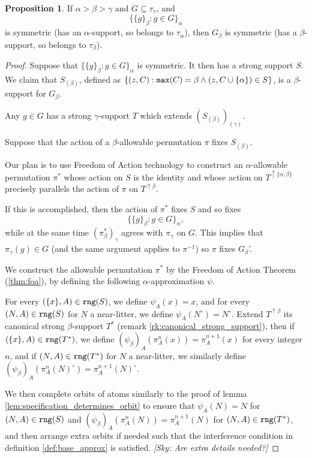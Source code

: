 \documentclass[112pt]{article}
\theoremstyle{definition}
\newtheorem{proposition}[theorem]{Proposition}
\theoremstyle{remark}
\newcommand{\rk}[1]{{\color{blue}\sl #1}}
\newcommand{\rk}[1]{}
\begin{document}
\begin{proposition}\label{prop:unions_of_singletons}
If  $\alpha>\beta>\gamma$ and $G \subseteq \tau_\gamma$, and $$\{\{g\}_\beta:g \in G\}_\alpha$$ is symmetric (has an $\alpha$-support, so belongs to $\tau_\alpha$), then $G_\beta$ is symmetric (has a $\beta$-support, so belongs to $\tau_\beta$).
\end{proposition}
\begin{proof}
Suppose that $\{\{g\}_\beta:g \in G\}_\alpha$ is symmetric.  It then has a strong support $S$.  We claim that $S_{(\beta)}$, defined as $\{(z,C): {\tt max}(C)=\beta \wedge (z,C\cup \{\alpha\}) \in S\}$,  is a $\beta$-support for $G_\beta$.

Any $g \in G$ has a strong $\gamma$-support $T$ which extends $(S_{(\beta)})_{(\gamma)}$.

Suppose that the action of a $\beta$-allowable permutation $\pi$ fixes $S_{(\beta)}$.

Our plan is to use Freedom of Action technology to construct an $\alpha$-allowable permutation $\pi^*$ whose action on $S$ is the identity
and whose action on $T^{\uparrow\{\alpha,\beta\}}$ precisely parallels the action of $\pi$ on $T^{\uparrow\beta}$. 

If this is accomplished, then the action of $\pi^*$ fixes $S$ and so fixes $$\{\{g\}_\beta:g \in G\}_\alpha,$$ while at the same
time $(\pi^*_\beta)_\gamma$ agrees with $\pi_\gamma$ on $G$.  This implies that $\pi_\gamma(g) \in G$ (and the same argument applies to $\pi^{-1}$)
so $\pi$ fixes $G_\beta$'.

We construct the allowable permutation $\pi^*$ by the Freedom of Action Theorem (\ref{thm:foa}), by defining the following $\alpha$-approximation $\psi$.

For every $(\{x\},A) \in {\tt rng}(S)$, we define $\psi_A(x) = x$, and for every $(N,A) \in {\tt rng}(S)$ for $N$ a near-litter, we define $\psi_A(N^\circ) = N^\circ$.
Extend $T^{\uparrow\beta}$ its canonical strong $\beta$-support $T^*$ {(remark \ref{rk:canonical_strong_support})}, then if $(\{x\},A) \in {\tt rng}(T^*)$, we define $(\psi_\beta)_A(\pi^n_A(x)) = \pi^{n+1}_A(x)$ for every integer $n$, and if $(N,A) \in {\tt rng}(T^*)$ for $N$ a near-litter, we similarly define $(\psi_\beta)_A(\pi^n_A(N)^\circ) = \pi^{n+1}_A(N)^\circ$.

We then complete orbits of atoms similarly to the proof of lemma \ref{lem:specification_determines_orbit} to ensure that $\psi_A(N) = N$ for $(N,A) \in {\tt rng}(S)$ and $(\psi_\beta)_A(\pi^n_A(N)) = \pi^{n+1}_A(N)$ for $(N,A) \in {\tt rng}(T^*)$, and then arrange extra orbits if needed such that the interference condition in definition \ref{def:base_approx} is satisfied.
\rk{[Sky:  Are extra details needed?]}


\end{proof}
\end{document}
